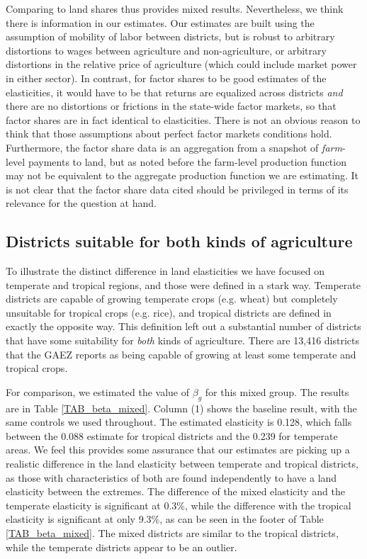 \documentclass[11pt]{article}
\begin{document}
Comparing to land shares thus provides mixed results. Nevertheless, we think there is information in our estimates. Our estimates are built using the assumption of mobility of labor between districts, but is robust to arbitrary distortions to wages between agriculture and non-agriculture, or arbitrary distortions in the relative price of agriculture (which could include market power in either sector). In contrast, for factor shares to be good estimates of the elasticities, it would have to be that returns are equalized across districts \textit{and} there are no distortions or frictions in the state-wide factor markets, so that factor shares are in fact identical to elasticities. There is not an obvious reason to think that those assumptions about perfect factor markets conditions hold. Furthermore, the factor share data is an aggregation from a snapshot of \textit{farm}-level payments to land, but as noted before the farm-level production function may not be equivalent to the aggregate production function we are estimating. It is not clear that the factor share data cited should be privileged in terms of its relevance for the question at hand.

\subsection{Districts suitable for both kinds of agriculture}
To illustrate the distinct difference in land elasticities we have focused on temperate and tropical regions, and those were defined in a stark way. Temperate districts are capable of growing temperate crops (e.g. wheat) but completely unsuitable for tropical crops (e.g. rice), and tropical districts are defined in exactly the opposite way. This definition left out a substantial number of districts that have some suitability for \textit{both} kinds of agriculture. There are 13,416 districts that the GAEZ reports as being capable of growing at least some temperate and tropical crops. 

For comparison, we estimated the value of $\beta_g$ for this mixed group. The results are in Table \ref{TAB_beta_mixed}. Column (1) shows the baseline result, with the same controls we used throughout. The estimated elasticity is 0.128, which falls between the 0.088 estimate for tropical districts and the 0.239 for temperate areas. We feel this provides some assurance that our estimates are picking up a realistic difference in the land elasticity between temperate and tropical districts, as those with characteristics of both are found independently to have a land elasticity between the extremes. The difference of the mixed elasticity and the temperate elasticity is significant at 0.3\%, while the difference with the tropical elasticity is significant at only 9.3\%, as can be seen in the footer of Table \ref{TAB_beta_mixed}. The mixed districts are similar to the tropical districts, while the temperate districts appear to be an outlier.
\end{document}
